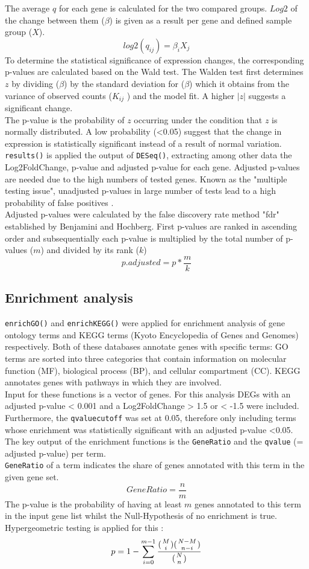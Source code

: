 \documentclass[twoside]{article}
\begin{document}
The average $q$ for each gene is calculated for the two compared groups. $Log2$ of the change between them ($\beta$) is given as a result per gene and defined sample group ($X$).\\
\[log2(q_{ij}) = \beta_{i}X_{j}\]
To determine the statistical significance of expression changes, the corresponding p-values are calculated based on the Wald test. The Walden test first determines $z$ by dividing ($\beta$) by the standard deviation for ($\beta$) which it obtains from the variance of observed counts ($K_{ij}$ ) and the model fit. A higher $|z|$ suggests a significant change.\\
The p-value is the probability of $z$ occurring under the condition that $z$ is normally distributed. A low probability (<0.05) suggest that the change in expression is statistically significant instead of a result of normal variation.
\texttt{results()} is applied the output of \texttt{DESeq()}, extracting among other data the Log2FoldChange, p-value and adjusted p-value for each gene. Adjusted p-values are needed due to the high numbers of tested genes. Known as the "multiple testing issue", unadjusted p-values in large number of tests lead to a high probability of false positives \citep{Pvalue}.\\
Adjusted p-values were calculated by the false discovery rate method "fdr" established by Benjamini and Hochberg. First p-values are ranked in ascending order and subsequentially each p-value is multiplied by the total number of p-values ($m$) and divided by its rank ($k$)
\[p.adjusted = p * \frac{m}{k}\]

\subsection{Enrichment analysis}
\texttt{enrichGO()} and \texttt{enrichKEGG()} were applied for enrichment analysis of gene ontology terms and KEGG terms (Kyoto Encyclopedia of Genes and Genomes) respectively. 
Both of these databases annotate genes with specific terms: GO terms are sorted into three categories that contain information on molecular function (MF), biological process (BP), and cellular compartment (CC). KEGG annotates genes with pathways in which they are involved. \\
Input for these functions is a vector of genes. For this analysis DEGs with an adjusted p-value < 0.001 and a Log2FoldChange > 1.5 or < -1.5 were included. Furthermore, the \texttt{qvaluecutoff} was set at 0.05, therefore only including terms whose enrichment was statistically significant with an adjusted p-value <0.05. 
The key output of the enrichment functions is the \texttt{GeneRatio} and the \texttt{qvalue} (= adjusted p-value) per term.\\
\texttt{GeneRatio} of a term indicates the share of genes annotated with this term in the given gene set.
\[Gene Ratio = \frac{n}{m}\]
The p-value is the probability of having at least $m$ genes annotated to this term in the input gene list whilst the Null-Hypothesis of no enrichment is true. Hypergeometric testing is applied for this \cite{enrichGo}:
\[p=1 - \sum_{i=0}^{m - 1}\frac{(\genfrac{}{}{0pt}{}{M}{i})(\genfrac{}{}{0pt}{}{N-M}{n-i})}{(\genfrac{}{}{0pt}{}{N}{n})}\]
\end{document}
